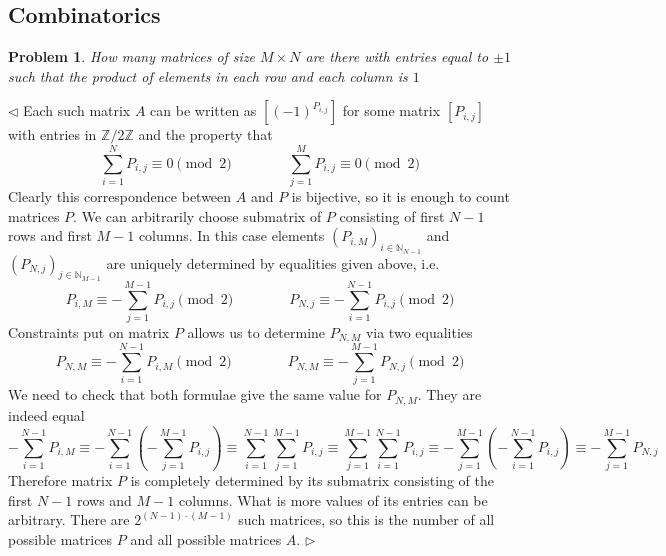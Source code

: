 \documentclass[12pt]{article}
\newtheorem{problem}{Problem}[subsection]
\newenvironment{solution}{\par $\triangleleft$}{$\triangleright$}
\begin{document}
 
 
 
 
 
 
 
 
 
 
 
 
 
 
 
\newpage
 
\subsection{Combinatorics}
 
\begin{problem} How many matrices of size $M\times N$ are there with entries equal to $\pm 1$ such that the product of elements in each row and each column is $1$
\end{problem}
\begin{solution} Each such matrix $A$ can be written as $[(-1)^{P_{i,j}}]$ for some matrix $[P_{i,j}]$ with entries in $\mathbb{Z}/2\mathbb{Z}$ and the property that
$$
\sum_{i=1}^N P_{i,j}\equiv 0 \pmod 2\qquad\qquad \sum_{j=1}^M P_{i,j}\equiv 0 \pmod 2
$$
Clearly this correspondence between $A$ and $P$ is bijective, so it is enough to count matrices $P$. We can arbitrarily choose submatrix of $P$ consisting of first $N-1$ rows and first $M-1$ columns. In this case elements $(P_{i,M})_{i\in\mathbb{N}_{N-1}}$ and $(P_{N,j})_{j\in\mathbb{N}_{M-1}}$ are uniquely determined by equalities given above, i.e.
$$
P_{i,M}\equiv-\sum_{j=1}^{M-1}P_{i,j} \pmod 2\qquad\qquad
P_{N,j}\equiv-\sum_{i=1}^{N-1}P_{i,j} \pmod 2
$$
Constraints put on matrix $P$ allows us to determine $P_{N,M}$ via two equalities
$$
P_{N,M}\equiv-\sum_{i=1}^{N-1}P_{i,M} \pmod 2\qquad\qquad
P_{N,M}\equiv-\sum_{j=1}^{M-1}P_{N,j} \pmod 2
$$
We need to check that both formulae give the same value for $P_{N,M}$. They are indeed equal
$$
-\sum_{i=1}^{N-1}P_{i,M}
\equiv-\sum_{i=1}^{N-1}\left(-\sum_{j=1}^{M-1}P_{i,j}\right)
\equiv\sum_{i=1}^{N-1}\sum_{j=1}^{M-1}P_{i,j}
\equiv\sum_{j=1}^{M-1}\sum_{i=1}^{N-1}P_{i,j}
\equiv-\sum_{j=1}^{M-1}\left(-\sum_{i=1}^{N-1} P_{i,j}\right)
\equiv-\sum_{j=1}^{M-1} P_{N,j}
$$
Therefore matrix $P$ is completely determined by its submatrix consisting of the first $N-1$ rows and $M-1$ columns. What is more values of its entries can be arbitrary. There are $2^{(N-1)\cdot(M-1)}$ such matrices, so this is the number of all possible matrices $P$ and all possible matrices $A$.
\end{solution}
 
\end{document}
